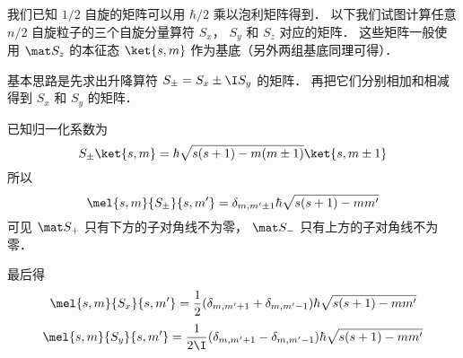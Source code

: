 

我们已知 $1/2$ 自旋的矩阵可以用 $\hbar/2$ 乘以泡利矩阵得到． 以下我们试图计算任意 $n/2$ 自旋粒子的三个自旋分量算符 $S_x$， $S_y$ 和 $S_z$ 对应的矩阵． 这些矩阵一般使用 $\mat S_z$ 的本征态 $\ket{s, m}$ 作为基底（另外两组基底同理可得）．

基本思路是先求出升降算符 $S_\pm = S_x \pm \I S_y$ 的矩阵． 再把它们分别相加和相减得到 $S_x$ 和 $S_y$ 的矩阵．

已知归一化系数为
\begin{equation}
S_\pm \ket{s,m} = \hbar \sqrt{s(s + 1) - m(m \pm 1)} \ket{s,m\pm1}
\end{equation}
所以
\begin{equation}
\mel{s,m}{S_\pm}{s,m'} = \delta_{m, m'\pm1} \hbar \sqrt{s(s + 1) - mm'}
\end{equation}
可见 $\mat S_+$ 只有下方的子对角线不为零， $\mat S_-$ 只有上方的子对角线不为零．

最后得
\begin{equation}
\mel{s,m}{S_x}{s,m'} = \frac12(\delta_{m, m'+1} + \delta_{m, m'-1})\hbar \sqrt{s(s + 1) - mm'} 
\end{equation}
\begin{equation}
\mel{s,m}{S_y}{s,m'} = \frac{1}{2\I}(\delta_{m, m'+1} - \delta_{m, m'-1}) \hbar \sqrt{s(s + 1) - mm'}
\end{equation}

